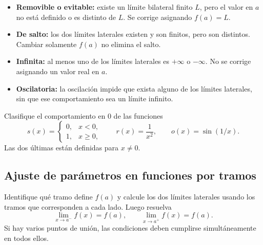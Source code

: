 \documentclass[10pt,a5paper]{article}
\newif\ifmostrarSoluciones
\begin{document}
\begin{definicion}
\begin{itemize}
  \item \textbf{Removible o evitable:} existe un límite bilateral finito $L$, pero el valor en $a$ no está definido o es distinto de $L$. Se corrige asignando $f(a)=L$.
  \item \textbf{De salto:} los dos límites laterales existen y son finitos, pero son distintos. Cambiar solamente $f(a)$ no elimina el salto.
  \item \textbf{Infinita:} al menos uno de los límites laterales es $+\infty$ o $-\infty$. No se corrige asignando un valor real en $a$.
  \item \textbf{Oscilatoria:} la oscilación impide que exista alguno de los límites laterales, sin que ese comportamiento sea un límite infinito.
\end{itemize}
\end{definicion}

\begin{ejemplo}[]
Clasifique el comportamiento en $0$ de las funciones
\[
  s(x)=\begin{cases}0,&x<0,\\1,&x\geq0,\end{cases}
  \qquad r(x)=\frac{1}{x^2},
  \qquad o(x)=\sin(1/x).
\]
Las dos últimas están definidas para $x\neq0$.
\end{ejemplo}
\ifmostrarSoluciones
\begin{solucion}
En $s$, los límites laterales son $0$ y $1$: hay un salto. En $r$, ambos límites laterales son $+\infty$: la discontinuidad es infinita. En $o$, los valores oscilan entre $-1$ y $1$ sin aproximarse a un único número: la discontinuidad es oscilatoria. Ninguna se elimina cambiando o asignando solamente el valor en $0$.
\end{solucion}
\else\vspace{20mm}\fi

\subsection*{Ajuste de parámetros en funciones por tramos}

\begin{criterio}
Identifique qué tramo define $f(a)$ y calcule los dos límites laterales usando los tramos que corresponden a cada lado. Luego resuelva
\[
  \lim_{x\to a^-}f(x)=f(a),\qquad
  \lim_{x\to a^+}f(x)=f(a).
\]
Si hay varios puntos de unión, las condiciones deben cumplirse simultáneamente en todos ellos.
\end{criterio}
\end{document}
